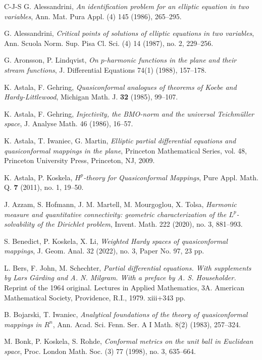 \documentclass[11pt,a4paper,reqno]{amsart}
\theoremstyle{definition}
\numberwithin{komcounter}{section}
\begin{document}
\begin{thebibliography}{C-J-S}
 G. Alessandrini, \emph{An identification problem for an elliptic equation in two variables}, Ann. Mat. Pura Appl. (4) 145 (1986), 265--295.

 G. Alessandrini, \emph{Critical points of solutions of elliptic equations in two variables}, Ann. Scuola Norm. Sup. Pisa Cl. Sci. (4) 14 (1987), no. 2, 229--256.

 G. Aronsson, P. Lindqvist, \emph{On $p$-harmonic functions in the plane and their stream functions}, J. Differential Equations 74(1) (1988), 157--178. 

 K. Astala,  F. Gehring, \textit{Quasiconformal analogues of theorems of Koebe and Hardy-Littlewood}, Michigan Math. J. \textbf{32} (1985), 99--107.

 K. Astala, F. Gehring, \emph{Injectivity, the BMO-norm and the universal Teichm\"uller space}, J. Analyse Math. 46 (1986), 16--57.

 K. Astala, T. Iwaniec, G. Martin, \emph{Elliptic partial differential equations and quasiconformal mappings in the plane}, Princeton Mathematical Series, vol. 48, Princeton University Press, Princeton, NJ, 2009.

 K. Astala, P. Koskela, {\it $H^p$-theory for Quasiconformal Mappings}, Pure Appl. Math. Q. \textbf{7} (2011), no. 1, 19--50.

 J. Azzam, S. Hofmann, J. M. Martell, M. Mourgoglou, X. Tolsa, \emph{Harmonic measure and quantitative connectivity: geometric characterization of the $L^p$-solvability of the Dirichlet problem}, Invent. Math. 222 (2020), no. 3, 881--993.

 S. Benedict, P. Koskela, X. Li, \emph{Weighted Hardy spaces of quasiconformal mappings}, 
J. Geom. Anal. 32 (2022), no. 3, Paper No. 97, 23 pp.


 L. Bers, F. John, M. Schechter, \emph{Partial differential equations. With supplements by Lars G\aa rding and A. N. Milgram. With a preface by A. S. Householder.} Reprint of the 1964 original. Lectures in Applied Mathematics, 3A. American Mathematical Society, Providence, R.I., 1979. xiii+343 pp.


 B. Bojarski, T. Iwaniec, \emph{Analytical foundations of the theory of quasiconformal mappings in $R^n$}, Ann. Acad. Sci. Fenn. Ser. A I Math. 8(2) (1983), 257--324.

 M. Bonk, P. Koskela, S. Rohde, \emph{Conformal metrics on the unit ball in Euclidean space}, Proc. London Math. Soc. (3) 77 (1998), no. 3, 635--664.


\end{thebibliography}
\end{document}
